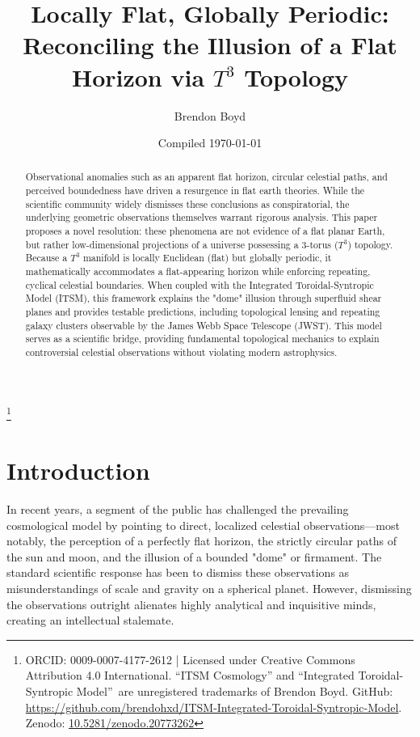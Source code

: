 \documentclass[aps,prd,11pt,onecolumn,superscriptaddress,nofootinbib,floatfix]{revtex4-2}
\begin{document}
\title{Locally Flat, Globally Periodic: \\ Reconciling the Illusion of a Flat Horizon via $T^3$ Topology}
\author{Brendon Boyd}
\thanks{ORCID: 0009-0007-4177-2612 | Licensed under Creative Commons Attribution 4.0 International. ``ITSM Cosmology'' and ``Integrated Toroidal-Syntropic Model''\texttrademark\ are unregistered trademarks of Brendon Boyd. GitHub: \url{https://github.com/brendohxd/ITSM-Integrated-Toroidal-Syntropic-Model}. Zenodo: \href{https://doi.org/10.5281/zenodo.20773262}{10.5281/zenodo.20773262}}
\date{Compiled \today}

\begin{abstract}
Observational anomalies such as an apparent flat horizon, circular celestial paths, and perceived boundedness have driven a resurgence in flat earth theories. While the scientific community widely dismisses these conclusions as conspiratorial, the underlying geometric observations themselves warrant rigorous analysis. This paper proposes a novel resolution: these phenomena are not evidence of a flat planar Earth, but rather low-dimensional projections of a universe possessing a 3-torus ($T^3$) topology. Because a $T^3$ manifold is locally Euclidean (flat) but globally periodic, it mathematically accommodates a flat-appearing horizon while enforcing repeating, cyclical celestial boundaries. When coupled with the Integrated Toroidal-Syntropic Model (ITSM), this framework explains the "dome" illusion through superfluid shear planes and provides testable predictions, including topological lensing and repeating galaxy clusters observable by the James Webb Space Telescope (JWST). This model serves as a scientific bridge, providing fundamental topological mechanics to explain controversial celestial observations without violating modern astrophysics.
\end{abstract}

\maketitle


\section{Introduction}
\label{sec:intro}

In recent years, a segment of the public has challenged the prevailing cosmological model by pointing to direct, localized celestial observations—most notably, the perception of a perfectly flat horizon, the strictly circular paths of the sun and moon, and the illusion of a bounded "dome" or firmament. The standard scientific response has been to dismiss these observations as misunderstandings of scale and gravity on a spherical planet. However, dismissing the observations outright alienates highly analytical and inquisitive minds, creating an intellectual stalemate.
\end{document}
